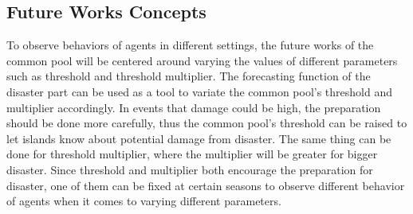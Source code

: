 \subsection{Future Works Concepts}
To observe behaviors of agents in different settings, the future works of the common pool will be centered around varying the values of different parameters such as threshold and threshold multiplier. The forecasting function of the disaster part can be used as a tool to variate the common pool’s threshold and multiplier accordingly. In events that damage could be high, the preparation should be done more carefully, thus the common pool’s threshold can be raised to let islands know about potential damage from disaster. The same thing can be done for threshold multiplier, where the multiplier will be greater for bigger disaster. Since threshold and multiplier both encourage the preparation for disaster, one of them can be fixed at certain seasons to observe different behavior of agents when it comes to varying different parameters. 
